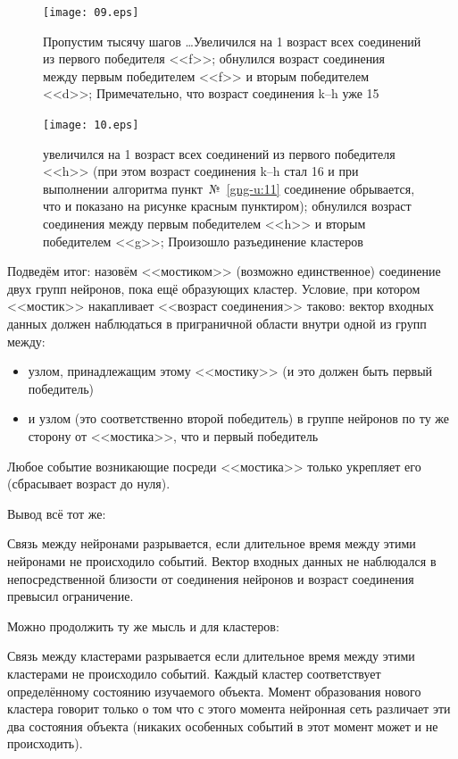 \documentclass[unicode, 12pt, a4paper,oneside,fleqn]{article}
\begin{document}
\begin{figure}[h]
  \center
  \texttt{[image: 09.eps]}
  \caption{Пропустим тысячу шагов \ldots Увеличился на 1 возраст всех
    соединений из первого победителя <<f>>; обнулился возраст
    соединения между первым победителем <<f>> и вторым победителем
    <<d>>; Примечательно, что возраст соединения k--h уже 15}
  \label{conn-step:09}
\end{figure}

\begin{figure}[h]
  \center
  \texttt{[image: 10.eps]}
  \caption{увеличился на 1 возраст всех соединений из первого
    победителя <<h>> (при этом возраст соединения k--h стал 16 и при
    выполнении алгоритма пункт~№~\ref{gng-u:11} соединение обрывается,
    что и показано на рисунке красным пунктиром); обнулился возраст
    соединения между первым победителем <<h>> и вторым победителем
    <<g>>; Произошло разъединение кластеров}
  \label{conn-step:10}
\end{figure}

\clearpage

Подведём итог: назовём <<мостиком>> (возможно единственное) соединение
двух групп нейронов, пока ещё образующих кластер. Условие, при котором
<<мостик>> накапливает <<возраст соединения>> таково: вектор входных
данных должен наблюдаться в приграничной области внутри одной из групп
между:
\begin{itemize}
\item узлом, принадлежащим этому <<мостику>> (и это должен быть первый
  победитель)
\item и узлом (это соответственно второй победитель) в группе нейронов
  по ту же сторону от <<мостика>>, что и первый победитель
\end{itemize}
Любое событие возникающие посреди <<мостика>> только укрепляет его
(сбрасывает возраст до нуля).

Вывод всё тот же:

Связь между нейронами разрывается, если длительное время между этими
нейронами не происходило событий. Вектор входных данных не наблюдался
в непосредственной близости от соединения нейронов и возраст
соединения превысил ограничение.

Можно продолжить ту же мысль и для кластеров:

Связь между кластерами разрывается если длительное время между этими
кластерами не происходило событий. Каждый кластер соответствует
определённому состоянию изучаемого объекта. Момент образования нового
кластера говорит только о том что с этого момента нейронная сеть
различает эти два состояния объекта (никаких особенных событий в этот
момент может и не происходить).


\newpage


\end{document}
